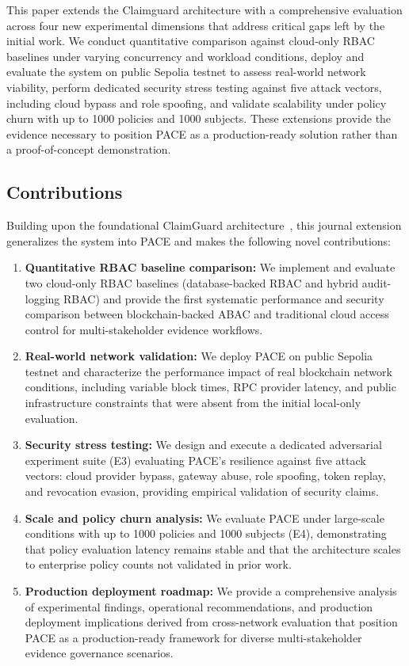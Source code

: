 \documentclass[pdflatex,sn-mathphys-num]{sn-jnl}
\begin{document}
This paper extends the Claimguard architecture with a comprehensive evaluation across four new experimental dimensions that address critical gaps left by the initial work. We conduct quantitative comparison against cloud-only RBAC baselines under varying concurrency and workload conditions, deploy and evaluate the system on public Sepolia testnet to assess real-world network viability, perform dedicated security stress testing against five attack vectors, including cloud bypass and role spoofing, and validate scalability under policy churn with up to 1000 policies and 1000 subjects. These extensions provide the evidence necessary to position PACE as a production-ready solution rather than a proof-of-concept demonstration.

\subsection{Contributions}

Building upon the foundational ClaimGuard architecture~\cite{eneh2025claimguard}, this journal extension generalizes the system into PACE and makes the following novel contributions:
\begin{enumerate}
	\item \textbf{Quantitative RBAC baseline comparison:} We implement and evaluate two cloud-only RBAC baselines (database-backed RBAC and hybrid audit-logging RBAC) and provide the first systematic performance and security comparison between blockchain-backed ABAC and traditional cloud access control for multi-stakeholder evidence workflows.

	\item \textbf{Real-world network validation:} We deploy PACE on public Sepolia testnet and characterize the performance impact of real blockchain network conditions, including variable block times, RPC provider latency, and public infrastructure constraints that were absent from the initial local-only evaluation.

	\item \textbf{Security stress testing:} We design and execute a dedicated adversarial experiment suite (E3) evaluating PACE's resilience against five attack vectors: cloud provider bypass, gateway abuse, role spoofing, token replay, and revocation evasion, providing empirical validation of security claims.

	\item \textbf{Scale and policy churn analysis:} We evaluate PACE under large-scale conditions with up to 1000 policies and 1000 subjects (E4), demonstrating that policy evaluation latency remains stable and that the architecture scales to enterprise policy counts not validated in prior work.

	\item \textbf{Production deployment roadmap:} We provide a comprehensive analysis of experimental findings, operational recommendations, and production deployment implications derived from cross-network evaluation that position PACE as a production-ready framework for diverse multi-stakeholder evidence governance scenarios.
\end{enumerate}
\end{document}
